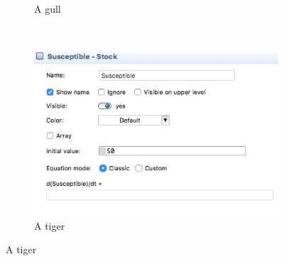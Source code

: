 \begin{figure}
\begin{subfigure}[b]{0.3\textwidth}
        \caption{A gull}
        \label{fig:gull}
    \end{subfigure}
    ~ %
    \begin{subfigure}[b]{0.3\textwidth}
        \includegraphics[width=\textwidth]{img/screens/basic/basic3}
        \caption{A tiger}
        \label{fig:tiger}
    \end{subfigure}
\end{figure}